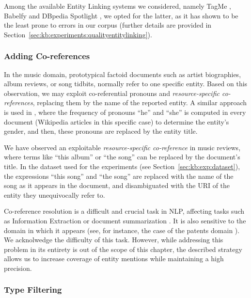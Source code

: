 Among the available Entity Linking systems we considered, namely TagMe \citep{Ferraginaetal2010}, Babelfy \citep{Moroetal2014} and DBpedia Spotlight \citep{Mendes2011}, we opted for the latter, as it has shown to be the least prone to errors in our corpus (further details are provided in Section~\ref{sec:kb:experiments:qualityentitylinking}).

\subsubsection{Adding Co-references}

In the music domain, prototypical factoid documents such as artist biographies, album reviews, or song tidbits, normally refer to one specific entity. Based on this observation, we may exploit co-referential pronouns and \textit{resource-specific co-references}, replacing them by the name of the reported entity.
A similar approach is used in \cite{Voskarides2015}, where the frequency of pronouns ``he'' and ``she'' is computed in every document (Wikipedia articles in this specific case) to determine the entity's gender, and then, these pronouns are replaced by the entity title. %

We have observed an exploitable \textit{resource-specific co-reference} in music reviews, where terms like ``this album'' or ``the song'' can be replaced by the document's title. In the dataset used for the experiments (see Section~\ref{sec:kb:exp:dataset}), the expressions ``this song'' and ``the song'' are replaced with the name of the song as it appears in the document, and disambiguated with the URI of the entity they unequivocally refer to.

Co-reference resolution is a difficult and crucial task in NLP, affecting tasks such as Information Extraction \citep{Soon2001} or document summarization \citep{saggion2004multi}. It is also sensitive to the domain in which it appears (see, for instance, the case of the patents domain \citep{Bouayad2014}). We acknolwedge the difficulty of this task. However, while addressing this problem in its entirety is out of the scope of this chapter, the described strategy allows us to increase coverage of entity mentions while maintaining a high precision.



\subsubsection{Type Filtering}
\label{sec:kb:typefiltering}

